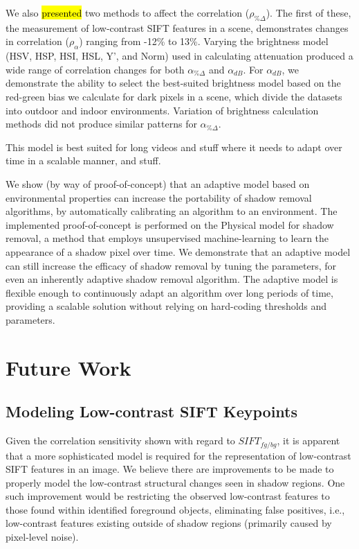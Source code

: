 We also \hl{presented} two methods to affect the correlation ($\rho_{\%\Delta}$). The first of these, the measurement of low-contrast SIFT features in a scene, demonstrates changes in correlation ($\rho_{\alpha}$) ranging from -12\% to 13\%. Varying the brightness model (HSV, HSP, HSI, HSL, Y', and Norm) used in calculating attenuation produced a wide range of correlation changes for both $\alpha_{\%\Delta}$ and $\alpha_{dB}$. For $\alpha_{dB}$, we demonstrate the ability to select the best-suited brightness model based on the red-green bias we calculate for dark pixels in a scene, which divide the datasets into outdoor and indoor environments. Variation of brightness calculation methods did not produce similar patterns for $\alpha_{\%\Delta}$.

This model is best suited for long videos and stuff where it needs to adapt over time in a scalable manner, and stuff.

We show (by way of proof-of-concept) that an adaptive model based on environmental properties can increase the portability of shadow removal algorithms, by automatically calibrating an algorithm to an environment. The implemented proof-of-concept is performed on the Physical model for shadow removal, a method that employs unsupervised machine-learning to learn the appearance of a shadow pixel over time. We demonstrate that an adaptive model can still increase the efficacy of shadow removal by tuning the parameters, for even an inherently adaptive shadow removal algorithm. The adaptive model is flexible enough to continuously adapt an algorithm over long periods of time, providing a scalable solution without relying on hard-coding thresholds and parameters. 

\section{Future Work}

\subsection{Modeling Low-contrast SIFT Keypoints}

Given the correlation sensitivity shown with regard to $SIFT_{fg/bg}$, it is apparent that a more sophisticated model is required for the representation of low-contrast SIFT features in an image. We believe there are improvements to be made to properly model the low-contrast structural changes seen in shadow regions. One such improvement would be restricting the observed low-contrast features to those found within identified foreground objects, eliminating false positives, i.e., low-contrast features existing outside of shadow regions (primarily caused by pixel-level noise).

